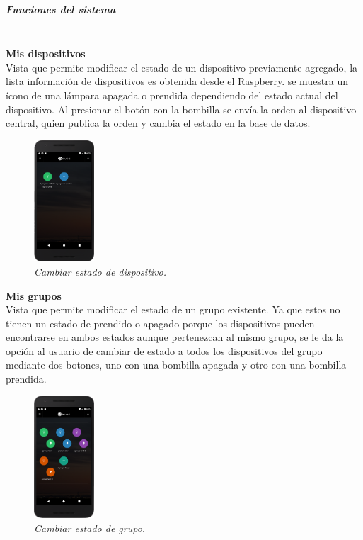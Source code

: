 \subparagraph{Funciones del sistema}\mbox{}\mbox{}\\

\textbf{Mis dispositivos}\\
Vista que permite modificar el estado de un dispositivo previamente agregado, la lista información de dispositivos es obtenida desde el Raspberry. se muestra un ícono de una lámpara apagada o prendida dependiendo del estado actual del dispositivo. Al presionar el botón con la bombilla se envía la orden al dispositivo central, quien publica la orden y cambia el estado en la base de datos.~

\begin{figure}[H]
  \centering
  \includegraphics[width=0.2\textwidth, keepaspectratio]{images/app-movil-choose-device}
  \caption{\textit{Cambiar estado de dispositivo.}}
  \label{fig:app-movil-choose-device}
\end{figure}

\textbf{Mis grupos}\\
Vista que permite modificar el estado de un grupo existente. Ya que estos no tienen un estado de prendido o apagado porque los dispositivos pueden encontrarse en ambos estados aunque pertenezcan al mismo grupo, se le da la opción al usuario de cambiar de estado a todos los dispositivos del grupo mediante dos botones, uno con una bombilla apagada y otro con una bombilla prendida.~

\begin{figure}[H]
  \centering
  \includegraphics[width=0.2\textwidth, keepaspectratio]{images/app-movil-control-group}
  \caption{\textit{Cambiar estado de grupo.}}
  \label{fig:app-movil-control-group}
\end{figure}


